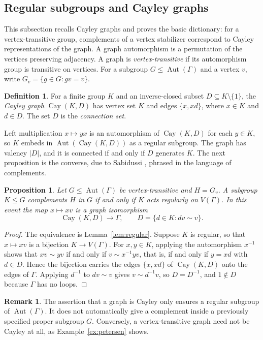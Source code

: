 \documentclass[12pt,letterpaper]{article}
\numberwithin{equation}{section}
\newtheorem{proposition}[theorem]{Proposition}
\theoremstyle{definition}
\newtheorem{definition}[theorem]{Definition}
\newtheorem{remark}[theorem]{Remark}
\DeclareMathOperator{\autt}{Aut}
\DeclareMathOperator{\cayy}{Cay}
\begin{document}
\subsection{Regular subgroups and Cayley graphs}
This subsection recalls Cayley graphs and proves the basic dictionary: for a vertex-transitive group, complements of a vertex stabilizer correspond to Cayley representations of the graph. A graph automorphism is a permutation of the vertices preserving adjacency. A graph is \emph{vertex-transitive} if its automorphism group is transitive on vertices. For a subgroup $G\leq\autt(\Gamma)$ and a vertex $v$, write $G_v=\{g\in G:gv=v\}$.
\begin{definition}
For a finite group $K$ and an inverse-closed subset $D\subseteq K\setminus\{1\}$, the \emph{Cayley graph} $\cayy(K,D)$ has vertex set $K$ and edges $\{x,xd\}$, where $x\in K$ and $d\in D$. The set $D$ is the \emph{connection set}.
\end{definition}
Left multiplication $x\mapsto yx$ is an automorphism of $\cayy(K,D)$ for each $y\in K$, so $K$ embeds in $\autt(\cayy(K,D))$ as a regular subgroup. The graph has valency $|D|$, and it is connected if and only if $D$ generates $K$. The next proposition is the converse, due to Sabidussi \cite{Sa58}, phrased in the language of complements.
\begin{proposition}\label{prop:graphcriterion}
Let $G\leq\autt(\Gamma)$ be vertex-transitive and $H=G_v$. A subgroup $K\leq G$ complements $H$ in $G$ if and only if $K$ acts regularly on $V(\Gamma)$. In this event the map $x\mapsto xv$ is a graph isomorphism
\[
\cayy(K,D)\longrightarrow\Gamma,\qquad D=\{d\in K: dv\sim v\}.
\]
\end{proposition}
\begin{proof}
The equivalence is Lemma~\ref{lem:regular}. Suppose $K$ is regular, so that $x\mapsto xv$ is a bijection $K\to V(\Gamma)$. For $x,y\in K$, applying the automorphism $x^{-1}$ shows that $xv\sim yv$ if and only if $v\sim x^{-1}yv$, that is, if and only if $y=xd$ with $d\in D$. Hence the bijection carries the edges $\{x,xd\}$ of $\cayy(K,D)$ onto the edges of $\Gamma$. Applying $d^{-1}$ to $dv\sim v$ gives $v\sim d^{-1}v$, so $D=D^{-1}$, and $1\notin D$ because $\Gamma$ has no loops.
\end{proof}
\begin{remark}
The assertion that a graph is Cayley only ensures a regular subgroup of $\autt(\Gamma)$. It does not automatically give a complement inside a previously specified proper subgroup $G$. Conversely, a vertex-transitive graph need not be Cayley at all, as Example~\ref{ex:petersen} shows.
\end{remark}
\end{document}
